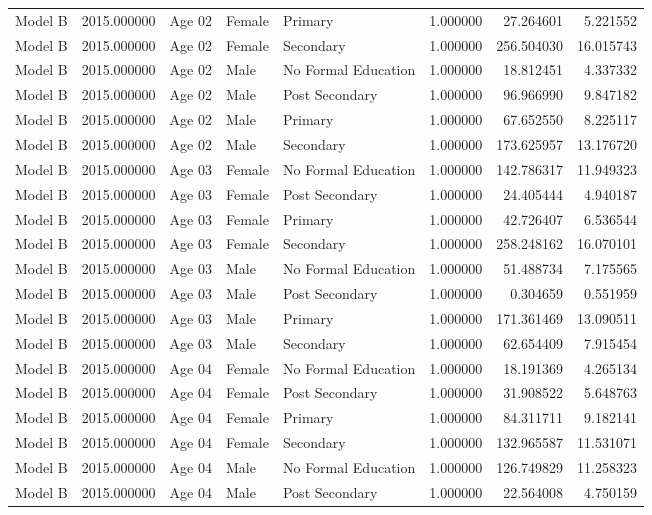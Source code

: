 \begin{table}[ht]
\begin{tabular}{lrlllrrr}
Model B & 2015.000000 & Age 02 & Female & Primary & 1.000000 & 27.264601 & 5.221552 \\
Model B & 2015.000000 & Age 02 & Female & Secondary & 1.000000 & 256.504030 & 16.015743 \\
Model B & 2015.000000 & Age 02 & Male & No Formal Education & 1.000000 & 18.812451 & 4.337332 \\
Model B & 2015.000000 & Age 02 & Male & Post Secondary & 1.000000 & 96.966990 & 9.847182 \\
Model B & 2015.000000 & Age 02 & Male & Primary & 1.000000 & 67.652550 & 8.225117 \\
Model B & 2015.000000 & Age 02 & Male & Secondary & 1.000000 & 173.625957 & 13.176720 \\
Model B & 2015.000000 & Age 03 & Female & No Formal Education & 1.000000 & 142.786317 & 11.949323 \\
Model B & 2015.000000 & Age 03 & Female & Post Secondary & 1.000000 & 24.405444 & 4.940187 \\
Model B & 2015.000000 & Age 03 & Female & Primary & 1.000000 & 42.726407 & 6.536544 \\
Model B & 2015.000000 & Age 03 & Female & Secondary & 1.000000 & 258.248162 & 16.070101 \\
Model B & 2015.000000 & Age 03 & Male & No Formal Education & 1.000000 & 51.488734 & 7.175565 \\
Model B & 2015.000000 & Age 03 & Male & Post Secondary & 1.000000 & 0.304659 & 0.551959 \\
Model B & 2015.000000 & Age 03 & Male & Primary & 1.000000 & 171.361469 & 13.090511 \\
Model B & 2015.000000 & Age 03 & Male & Secondary & 1.000000 & 62.654409 & 7.915454 \\
Model B & 2015.000000 & Age 04 & Female & No Formal Education & 1.000000 & 18.191369 & 4.265134 \\
Model B & 2015.000000 & Age 04 & Female & Post Secondary & 1.000000 & 31.908522 & 5.648763 \\
Model B & 2015.000000 & Age 04 & Female & Primary & 1.000000 & 84.311711 & 9.182141 \\
Model B & 2015.000000 & Age 04 & Female & Secondary & 1.000000 & 132.965587 & 11.531071 \\
Model B & 2015.000000 & Age 04 & Male & No Formal Education & 1.000000 & 126.749829 & 11.258323 \\
Model B & 2015.000000 & Age 04 & Male & Post Secondary & 1.000000 & 22.564008 & 4.750159 \\

\end{tabular}
\end{table}
